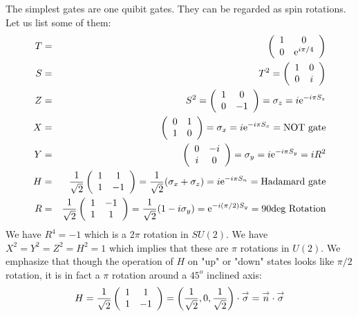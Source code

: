 \documentclass[onecolumn,fleqn]{revtex4}
\newcommand{\eexp}{\mathrm{e}^}
\newcommand{\beq}{\begin{eqnarray}}
\newcommand{\eeq}{\end{eqnarray}}
\begin{document}
The simplest gates are one quibit gates.
They can be regarded as spin rotations. 
Let us list some of them:
\beq
T &=& \left(
\begin{array}
[c]{cc}1 & 0\\
0 & \eexp{i\pi/4}\end{array}
\right)  
\\ \nonumber
S &=& T^{2}=\left(
\begin{array}
[c]{cc}1 & 0\\
0 & i
\end{array}
\right)  
\\ \nonumber
Z &=& S^{2}=\left(
\begin{array}
[c]{cc}
1 & 0\\
0 & -1
\end{array}
\right) =  \sigma_{z} = i\eexp{-i\pi S_{z}}
\\ \nonumber
X &=& \left(
\begin{array}
[c]{cc} 
0 & 1\\
1 & 0
\end{array}
\right)  = \sigma_{x} = i\eexp{-i\pi S_{x}} = \mbox{NOT gate}
\\ \nonumber
Y &=& \left(
\begin{array}
[c]{cc}0 & -i\\
i & 0
\end{array}
\right)  = \sigma_{y} =  i\eexp{-i\pi S_{y}} = iR^2
\\ \nonumber
H &=& 
\frac{1}{\sqrt{2}}
\left(
\begin{array}
[c]{cc}1 & 1\\
1 & -1
\end{array} 
\right) 
= \frac{1}{\sqrt{2}}(\sigma_x+\sigma_z)
= i\eexp{-i\pi S_{n}} 
= \mbox{Hadamard gate}
\\ \nonumber
R &=& 
\frac{1}{\sqrt{2}}
\left(
\begin{array}
[c]{cc}1 & -1\\
1 & 1
\end{array} 
\right) 
= \frac{1}{\sqrt{2}}(1-i\sigma_y)
= \eexp{-i(\pi/2) S_{y}} 
= \mbox{90deg Rotation}
\eeq
We have $R^4=-1$ which is a $2\pi$ rotation in $SU(2)$.
We have $X^{2}=Y^{2}=Z^{2}=H^{2}=1$ which implies 
that these are $\pi$ rotations in $U(2)$.  
We emphasize that though the operation of $H$ on "up" 
or "down" states looks like $\pi/2$ rotation, 
it is in fact a $\pi$ rotation around a $45^o$ inclined axis:   
\beq
H =
\frac{1}{\sqrt{2}}\left(
\begin{array}
[c]{cc}1 & 1\\
1 & -1
\end{array}
\right)  =\left(  \frac{1}{\sqrt{2}},0,\frac{1}{\sqrt{2}}\right)
\cdot\overset{\rightarrow}{\sigma}=\overset{\rightarrow}{n}\cdot
\overset{\rightarrow}{\sigma}
\eeq
\end{document}
